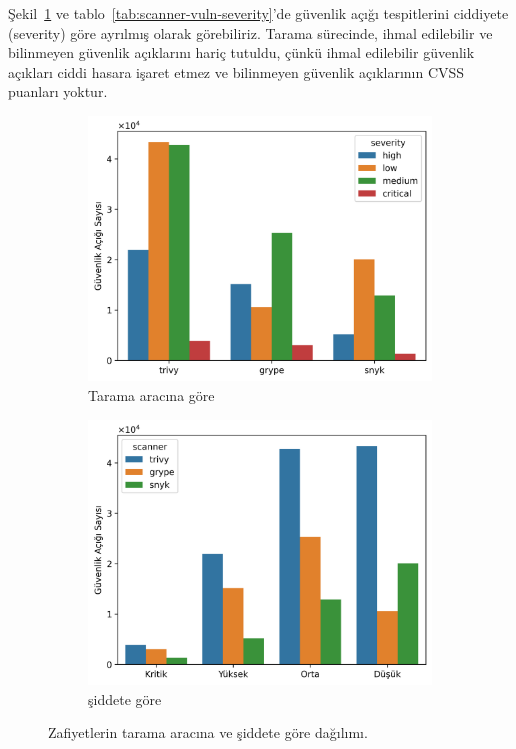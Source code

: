 Şekil~\ref{fig:vulnerabilities-by-severity} ve tablo~\ref{tab:scanner-vuln-severity}'de güvenlik açığı tespitlerini ciddiyete (severity) göre ayrılmış olarak görebiliriz. Tarama sürecinde, ihmal edilebilir ve bilinmeyen güvenlik açıklarını hariç tutuldu, çünkü ihmal edilebilir güvenlik açıkları ciddi hasara işaret etmez ve bilinmeyen güvenlik açıklarının CVSS puanları yoktur.

\begin{figure}[!htbp]
	\centering
	\begin{subfigure}[Figure A]{\linewidth/2}
		\includegraphics[width=1\linewidth]{images/s1/scanner-vuln-and-severity.png}
		\caption{Tarama aracına göre}\label{fig:vulnerabilities-by-severity}
	\end{subfigure}%
	\begin{subfigure}[Figure A]{\linewidth/2}
		\includegraphics[width=1\linewidth]{images/s1/severity-hue-scanner.png}
    \caption{şiddete göre}\label{fig:severity-hue-scanner}
	\end{subfigure}
 
	\caption{Zafiyetlerin tarama aracına ve şiddete göre dağılımı.}\label{fig:fig3}
\end{figure}

